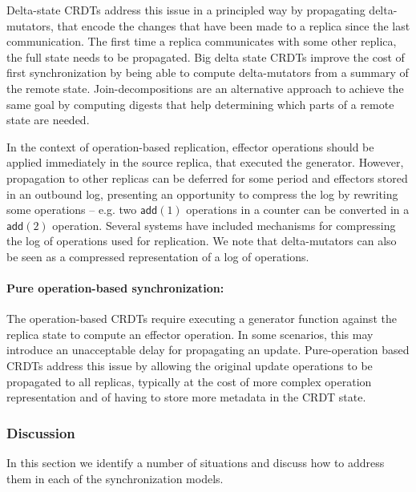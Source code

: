 \documentclass[12pt]{article}
\begin{document}
Delta-state CRDTs \cite{DBLP:conf/netys/AlmeidaSB15,DBLP:journals/jpdc/AlmeidaSB18} address this issue 
in a principled way by propagating delta-mutators, that encode the changes that have been made
to a replica since the last communication.
The first time a replica communicates with some other replica, the full state
needs to be propagated.
Big delta state CRDTs \cite{vanderLinde06bigdelta} improve the cost of 
first synchronization by being able to compute delta-mutators from a summary
of the remote state. 
Join-decompositions \cite{Enes2017} are an alternative approach to achieve the same goal 
by computing digests that help determining which parts of a remote state are needed.

In the context of operation-based replication, effector operations should be applied 
immediately in the source replica, that executed the generator. 
However, propagation to other replicas can be deferred for some period and 
effectors stored in an outbound log, presenting an opportunity to 
compress the log by rewriting some operations -- e.g. two $\mathsf{add}(1)$ operations
in a counter can be converted in a $\mathsf{add}(2)$ operation. 
Several systems \cite{rover,Kistler92Disconnected,Preguica00Data,Cabrita17Non} have included
mechanisms for compressing the log of operations used for replication.
We note that delta-mutators can also be seen as a compressed representation
of a log of operations.

\paragraph{Pure operation-based synchronization:}
The operation-based CRDTs require executing a generator function against
the replica state to compute an effector operation.
In some scenarios, this may introduce an unacceptable delay for propagating
an update. 
Pure-operation based CRDTs \cite{Baquero14Making} address this issue by 
allowing the original update operations to be propagated to all replicas,
typically at the cost of more complex operation representation and 
of having to store more metadata in the CRDT state.

\subsubsection{Discussion}

In this section we identify a number of situations and discuss how to address
them in each of the synchronization models.
\end{document}

